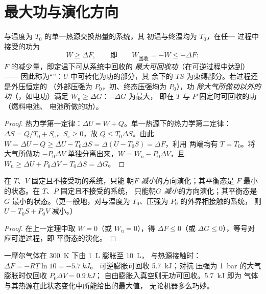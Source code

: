 \section{最大功与演化方向}

\begin{theorem}[单热源过程]\label{thm:b2:thermodynamic-potentials:monothermal}
与温度为 $T_0$ 的单一热源交换热量的系统，其
初温与终温均为 $T_0$，在任一
过程中接受的功为
\[
W \ge \Delta F , \qquad\text{即}\qquad W_{\text{回收}} = -W \le -\Delta F :
\]
$F$ 的减少量，即定温下可从系统中回收的
\emph{最大可回收功}（在可逆过程中达到）——
因此称为“”：$U$ 中可转化为功的部分，其
余下的 $TS$ 为束缚部分。若过程还是外压恒定的
（外部压强为 $P_0$，初、终态压强均为 $P_0$），功
\emph{除大气所做功以外的功}（，如电功）满足
$W_{\text{u}} \ge \Delta G$：$-\Delta G$ 为最大，
即在 $T$ 与 $P$ 固定时可回收的功（燃料电池、
电池所做的功）。
\end{theorem}

\begin{proof}
热力学第一定律：$\Delta U = W + Q$。单一热源下的热力学第二定律：$\Delta S
= Q/T_0 + S_{\text{c}}$，$S_{\text{c}} \ge 0$，故 $Q \le T_0\Delta S$。由此
$W = \Delta U - Q \ge \Delta U - T_0\Delta S = \Delta(U - T_0S) = \Delta F$，利用
两端均有 $T = T_0$。将大气所做功 $-P_0\Delta V$
单独分离出来，$W = W_{\text{u}} - P_0\Delta V$，且 $W_{\text{u}} \ge \Delta U + P_0
\Delta V - T_0\Delta S = \Delta G$。
\end{proof}

\begin{theorem}[演化与平衡判据]\label{thm:b2:thermodynamic-potentials:criteria}
在 $T$、$V$ 固定且不接受功的系统，只能
朝\emph{$F$ 减小}的方向演化；其平衡态是
$F$ 最小的状态。在 $T$、$P$ 固定且不接受的系统，
只能朝\emph{$G$ 减小}的方向演化；其平衡态是
$G$ 最小的状态。（更一般地，对与温度为 $T_0$、压强为 $P_0$ 的外界相接触的系统，
则 $U - T_0S + P_0V$ 减小。）
\end{theorem}

\begin{proof}
在上一定理中取 $W = 0$（或 $W_{\text{u}} = 0$），得 $\Delta F
\le 0$（或 $\Delta G \le 0$），等号对应可逆过程，即
平衡态的演化。
\end{proof}

\begin{example}\label{ex:b2:thermodynamic-potentials:expansion}
一摩尔气体在 \qty{300}{K} 下由 \qty{1}{L} 膨胀至 \qty{10}{L}，
与热源接触时：$\Delta F = -RT\ln 10 = \qty{-5.7}{kJ}$。
可逆膨胀可回收 \qty{5.7}{kJ}；对抗
压强为 \qty{1}{bar} 的大气膨胀时仅回收 $P_0\Delta V = \qty{0.9}{kJ}$；
自由膨胀入真空则无功可回收。\qty{5.7}{kJ} 即为
气体与其热源在此状态变化中所能给出的最大值，
无论机器多么巧妙。
\end{example}

